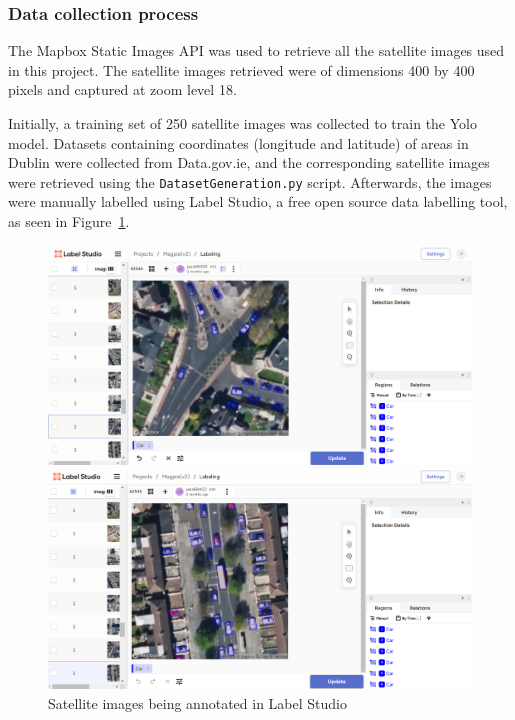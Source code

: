 \subsubsection{Data collection process}
The Mapbox Static Images API was used to retrieve all the satellite images used in this project.
The satellite images retrieved were of dimensions 400 by 400 pixels and captured at zoom level 18.

Initially, a training set of 250 satellite images was collected to train the Yolo model.
Datasets containing coordinates (longitude and latitude) of areas in Dublin were collected from Data.gov.ie, and the corresponding satellite images were retrieved using the \texttt{DatasetGeneration.py} script.
Afterwards, the images were manually labelled using Label Studio, a free open source data labelling tool, as seen in Figure~\ref{fig:LabelStudio}.

\begin{figure}[htbp]
    \centering
    \begin{minipage}{0.49\textwidth}
        \centering
        \includegraphics[width=\textwidth]{images/label_studio1.png}
    \end{minipage}
    \hfill
    \begin{minipage}{0.49\textwidth}
        \centering
        \includegraphics[width=\textwidth]{images/label_studio2.png}
    \end{minipage}
    \caption{Satellite images being annotated in Label Studio}
    \label{fig:LabelStudio}
\end{figure}


